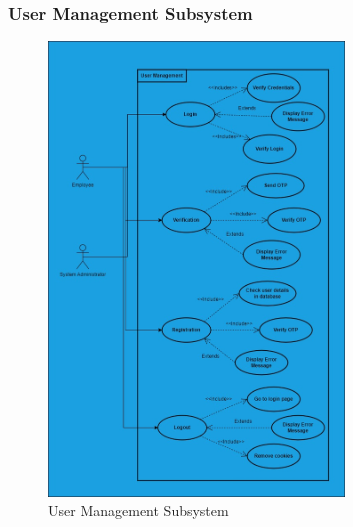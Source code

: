 \documentclass[11pt,a4paper]{article}
\begin{document}
\subsubsection*{User Management Subsystem}
\begin{figure}[htbp]
    \centering
    \includegraphics[width=0.7\textwidth]{User_Management.jpg}
    \caption{User Management Subsystem}
\end{figure}

\pagebreak
\end{document}
